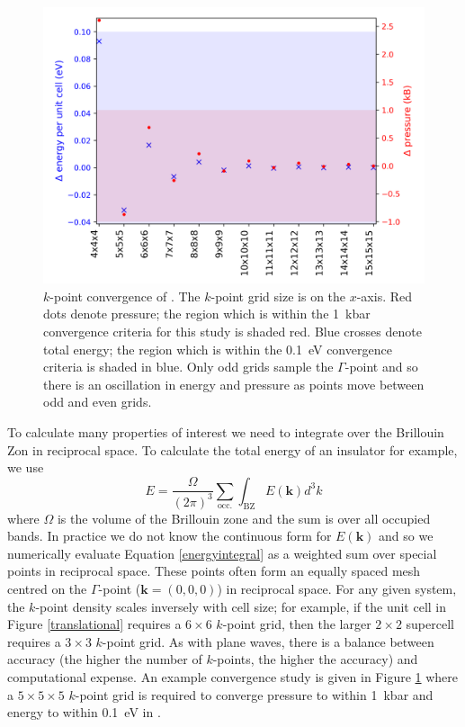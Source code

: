 \begin{figure}[h]
\centering
  \includegraphics[width=0.7\columnwidth]{figures/ch3/kpointconvergence.png}
  \caption[$k$-point convergence of ]{$k$-point convergence of . The $k$-point grid size is on the $x$-axis. Red dots denote pressure; the region which is within the \SI{1}{\kilo\bar} convergence criteria for this study is shaded red. Blue crosses denote total energy; the region which is within the \SI{0.1}{\electronvolt} convergence criteria is shaded in blue. Only odd grids sample the $\Gamma$-point and so there is an oscillation in energy and pressure as points move between odd and even grids.}
  \label{kpointconvergence}
\end{figure}

To calculate many properties of interest we need to integrate over the Brillouin Zon in reciprocal space. To calculate the total energy of an insulator for example, we use
\begin{equation} \label{energyintegral}
    E = \frac{\Omega}{(2\pi)^3}\sum_\textrm{occ.}\int_\textrm{BZ}E(\textbf{k})d^3k
\end{equation}
where $\Omega$ is the volume of the Brillouin zone and the sum is over all occupied bands. 
In practice we do not know the continuous form for $E(\textbf{k})$ and so we numerically evaluate Equation \ref{energyintegral} as a weighted sum over special points in reciprocal space. These points often form an equally spaced mesh centred on the $\Gamma$-point ($\textbf{k}=(0,0,0)$) in reciprocal space. For any given system, the $k$-point density scales inversely with cell size; for example, if the unit cell in Figure \ref{translational} requires a $6\times6$ $k$-point grid, then the larger $2\times2$ supercell requires a $3\times3$ $k$-point grid. As with plane waves, there is a balance between accuracy (the higher the number of $k$-points, the higher the accuracy) and computational expense. An example convergence study is given in Figure \ref{kpointconvergence} where a $5\times5\times5$ $k$-point grid is required to converge pressure to within \SI{1}{\kilo\bar} and energy to within \SI{0.1}{\electronvolt} in .


